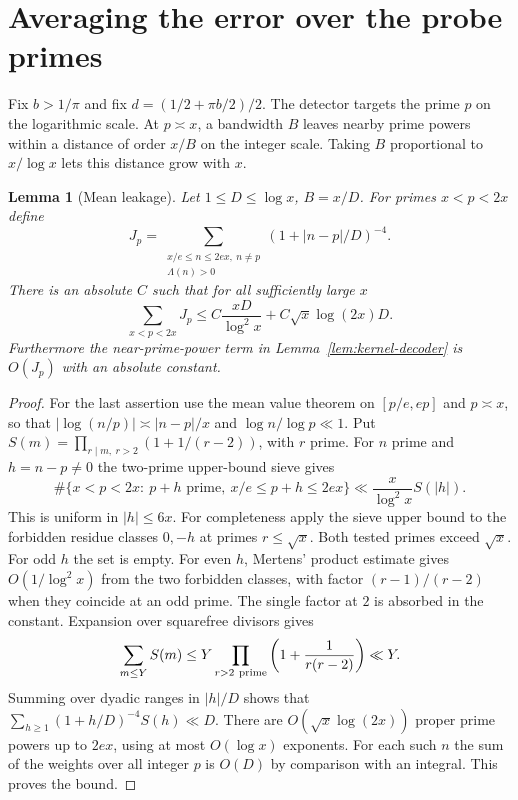 \documentclass[11pt]{article}
\newtheorem{lemma}[theorem]{Lemma}
\begin{document}


\section{Averaging the error over the probe primes}
Fix $b>1/\pi$ and fix $d=(1/2+\pi b/2)/2$. The detector targets the prime
$p$ on the logarithmic scale. At $p\asymp x$, a bandwidth $B$ leaves nearby
prime powers within a distance of order $x/B$ on the integer scale. Taking
$B$ proportional to $x/\log x$ lets this distance grow with $x$.
\begin{lemma}[Mean leakage]\label{lem:leak}
Let $1\le D\le\log x$, $B=x/D$. For primes $x<p<2x$ define
\[
 J_p=\sum_{\substack{x/e\le n\le 2ex,\ n\ne p\\ \Lambda(n)>0}}
              (1+|n-p|/D)^{-4}.
\]
There is an absolute $C$ such that for all sufficiently large $x$
\[
 \sum_{x<p<2x} J_p
 \le C\frac{xD}{\log^2 x}+C\sqrt{x}\log(2x)D.
\]
Furthermore the near-prime-power term in Lemma~\ref{lem:kernel-decoder}
is $O(J_p)$ with an absolute constant.
\end{lemma}
\begin{proof}
For the last assertion use the mean value theorem on $[p/e,ep]$ and
$p\asymp x$, so that $|\log(n/p)|\asymp|n-p|/x$ and $\log n/\log p\ll1$.
Put $S(m)=\prod_{r\mid m,\ r>2}(1+1/(r-2))$, with $r$ prime.
For $n$ prime and $h=n-p\ne0$ the two-prime upper-bound sieve gives
\[
 \#\{x<p<2x:\ p+h\text{ prime},\ x/e\le p+h\le2ex\}
 \ll \frac{x}{\log^2 x} S(|h|).
\]
This is uniform in $|h|\le 6x$. For completeness apply the sieve upper
bound \cite[Lemma 3.2]{sieve} to the forbidden residue classes $0,-h$
at primes $r\le\sqrt x$. Both tested primes exceed $\sqrt x$.
For odd $h$ the set is empty. For even $h$, Mertens' product estimate gives
$O(1/\log^2 x)$ from the two forbidden classes, with factor
$(r-1)/(r-2)$ when they coincide at an odd prime. The single factor at $2$
is absorbed in the constant. Expansion over squarefree divisors gives
\[
 \sum_{m\le Y}S(m)\le Y\prod_{r>2\ {\rm prime}}
       \left(1+\frac{1}{r(r-2)}\right)\ll Y.
\]
Summing over dyadic ranges in $|h|/D$ shows that
$\sum_{h\ge1}(1+h/D)^{-4} S(h)\ll D$.
There are $O(\sqrt x\log(2x))$ proper prime powers up to $2ex$, using
at most $O(\log x)$ exponents. For each such $n$ the sum of the weights over
all integer $p$ is $O(D)$ by comparison with an integral. This proves the bound.
\end{proof}
\end{document}
